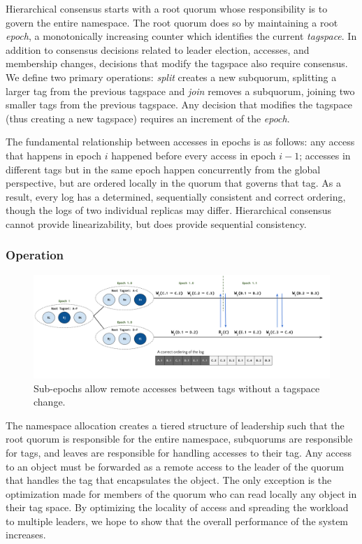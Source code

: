 \documentclass{article}
\begin{document}
Hierarchical consensus starts with a root quorum whose responsibility is to govern the entire namespace. The root quorum does so by maintaining a root \textit{epoch}, a monotonically increasing counter which identifies the current \textit{tagspace}. In addition to consensus decisions related to leader election, accesses, and membership changes, decisions that modify the tagspace also require consensus. We define two primary operations: \textit{split} creates a new subquorum, splitting a larger tag from the previous tagspace and \textit{join} removes a subquorum, joining two smaller tags from the previous tagspace. Any decision that modifies the tagspace (thus creating a new tagspace) requires an increment of the \textit{epoch}.

The fundamental relationship between accesses in epochs is as follows: any access that happens in epoch $i$ happened before every access in epoch $i-1$; accesses in different tags but in the same epoch happen concurrently from the global perspective, but are ordered locally in the quorum that governs that tag. As a result, every log has a determined, sequentially consistent and correct ordering, though the logs of two individual replicas may differ. Hierarchical consensus cannot provide linearizability, but does provide sequential consistency.

\subsubsection{Operation}
\label{sec:hierarchical_operation}

\begin{figure}
    \centering
        \includegraphics[width=.9\textwidth]{figures/subepoch}
        \caption{Sub-epochs allow remote accesses between tags without a tagspace change.}
        \label{fig:subepoch}
\end{figure}

The namespace allocation creates a tiered structure of leadership such that the root quorum is responsible for the entire namespace, subquorums are responsible for tags, and leaves are responsible for handling accesses to their tag. Any access to an object must be forwarded as a remote access to the leader of the quorum that handles the tag that encapsulates the object. The only exception is the optimization made for members of the quorum who can read locally any object in their tag space. By optimizing the locality of access and spreading the workload to multiple leaders, we hope to show that the overall performance of the system increases.
\end{document}
